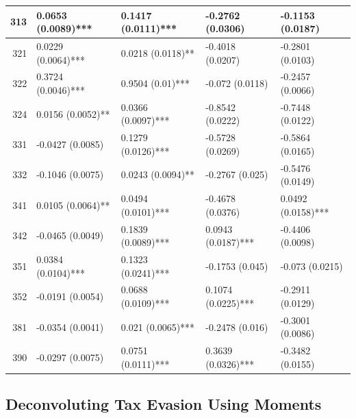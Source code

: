 \documentclass[
  12pt]{article}
\theoremstyle{definition}
\theoremstyle{remark}
\begin{document}
\begin{table}
{\begin{tabular}[t]{r|l|l|l|l}
\hspace{1em}313 & 0.0653 (0.0089)*** & 0.1417 (0.0111)*** & -0.2762 (0.0306) & -0.1153 (0.0187)\\
\hline
\hspace{1em}321 & 0.0229 (0.0064)*** & 0.0218 (0.0118)** & -0.4018 (0.0207) & -0.2801 (0.0103)\\
\hline
\hspace{1em}322 & 0.3724 (0.0046)*** & 0.9504 (0.01)*** & -0.072 (0.0118) & -0.2457 (0.0066)\\
\hline
\hspace{1em}324 & 0.0156 (0.0052)** & 0.0366 (0.0097)*** & -0.8542 (0.0222) & -0.7448 (0.0122)\\
\hline
\hspace{1em}331 & -0.0427 (0.0085) & 0.1279 (0.0126)*** & -0.5728 (0.0269) & -0.5864 (0.0165)\\
\hline
\hspace{1em}332 & -0.1046 (0.0075) & 0.0243 (0.0094)** & -0.2767 (0.025) & -0.5476 (0.0149)\\
\hline
\hspace{1em}341 & 0.0105 (0.0064)** & 0.0494 (0.0101)*** & -0.4678 (0.0376) & 0.0492 (0.0158)***\\
\hline
\hspace{1em}342 & -0.0465 (0.0049) & 0.1839 (0.0089)*** & 0.0943 (0.0187)*** & -0.4406 (0.0098)\\
\hline
\hspace{1em}351 & 0.0384 (0.0104)*** & 0.1323 (0.0241)*** & -0.1753 (0.045) & -0.073 (0.0215)\\
\hline
\hspace{1em}352 & -0.0191 (0.0054) & 0.0688 (0.0109)*** & 0.1074 (0.0225)*** & -0.2911 (0.0129)\\
\hline
\hspace{1em}381 & -0.0354 (0.0041) & 0.021 (0.0065)*** & -0.2478 (0.016) & -0.3001 (0.0086)\\
\hline
\hspace{1em}390 & -0.0297 (0.0075) & 0.0751 (0.0111)*** & 0.3639 (0.0326)*** & -0.3482 (0.0155)\\
\hline
\end{tabular}

}

\end{table}%

\subsection{Deconvoluting Tax Evasion Using
Moments}\label{deconvoluting-tax-evasion-using-moments}
\end{document}
